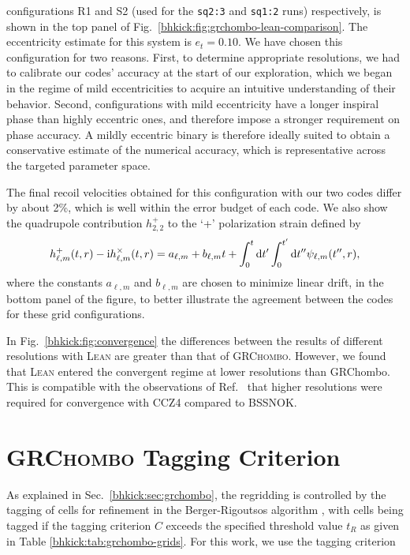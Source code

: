 configurations R1 and S2 (used for the \texttt{sq2:3} and \texttt{sq1:2} runs) 
respectively, is shown in the top panel of Fig.~\ref{bhkick:fig:grchombo-lean-comparison}.
The eccentricity estimate for this system is $e_t=0.10$. We have chosen
this configuration for two reasons. First, to determine appropriate
resolutions, we had to calibrate our codes' accuracy at the start of
our exploration, which we began in the regime of mild eccentricities to
acquire an intuitive understanding of their behavior. Second, 
configurations with mild eccentricity have a longer inspiral phase
than highly eccentric ones, and therefore impose a stronger requirement
on phase accuracy. A mildly eccentric binary is therefore ideally suited
to obtain a conservative estimate of the numerical accuracy, which is representative across the targeted parameter space.

The final recoil velocities obtained for this configuration with
our two codes differ by about 2\%, which is well within the error budget 
of each code.
We also show the quadrupole contribution
$h^+_{2,2}$ to the `+' polarization strain defined by \cite{Bishop:2016lgv}
\begin{equation}
    h^+_{\ell,m}(t,r)-\mathrm{i}h^\times_{\ell,m}(t,r) 
    = a_{\ell,m} + b_{\ell,m}t + \int_0^t\mathrm{d} t^\prime\int_0^{t^\prime}
    \mathrm{d} t^{\prime\prime}\psi_{\ell,m}(t^{\prime\prime},r),
    \label{bhkick:eq:strain}
\end{equation}
where the constants $a_{\ell,m}$ and $b_{\ell,m}$ are chosen to minimize 
linear drift,
in the bottom panel of the figure, to better illustrate the agreement
between the codes for these grid configurations.

In Fig.~\ref{bhkick:fig:convergence} the differences between the results of 
different resolutions with \textsc{Lean} are greater than that of
\textsc{GRChombo}. However, we found that \textsc{Lean} entered the 
convergent regime at lower resolutions than {\sc GRChombo}. This is compatible 
with the observations of Ref.~\cite{Alic:2011gg} that higher resolutions 
were required for convergence with CCZ4 compared to BSSNOK.




\section{\textsc{GRChombo} Tagging Criterion}
\label{bhkick:sec:tagging}
%
%
As explained in Sec.~\ref{bhkick:sec:grchombo}, the regridding is controlled by 
the tagging of cells for refinement in the Berger-Rigoutsos algorithm 
\cite{Berger1991}, with cells being tagged if the tagging criterion $C$ 
exceeds the specified threshold value $t_R$ as given in Table 
\ref{bhkick:tab:grchombo-grids}. For this work, we use the 
tagging criterion

